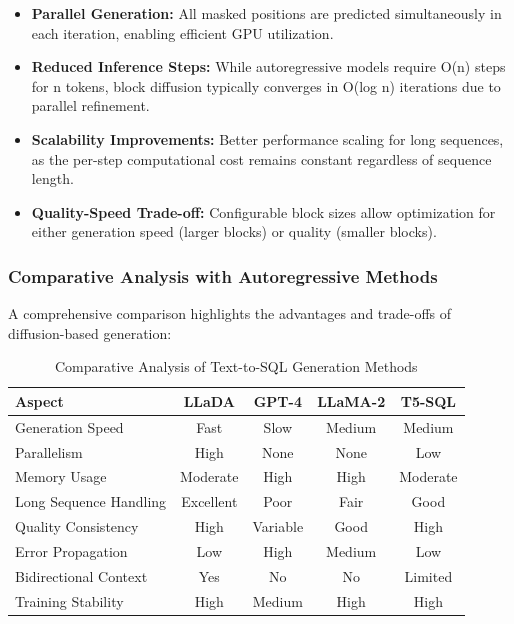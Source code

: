 \documentclass[a4paper,12pt]{article}
\begin{document}
\begin{itemize}
    \item \textbf{Parallel Generation:} All masked positions are predicted simultaneously in each iteration, enabling efficient GPU utilization.
    
    \item \textbf{Reduced Inference Steps:} While autoregressive models require O(n) steps for n tokens, block diffusion typically converges in O(log n) iterations due to parallel refinement.
    
    \item \textbf{Scalability Improvements:} Better performance scaling for long sequences, as the per-step computational cost remains constant regardless of sequence length.
    
    \item \textbf{Quality-Speed Trade-off:} Configurable block sizes allow optimization for either generation speed (larger blocks) or quality (smaller blocks).
\end{itemize}

\subsubsection*{Comparative Analysis with Autoregressive Methods}
A comprehensive comparison highlights the advantages and trade-offs of diffusion-based generation:

\begin{table}[H]
    \centering
    \begin{tabular}{lcccc}
        \toprule
        \textbf{Aspect} & \textbf{LLaDA} & \textbf{GPT-4} & \textbf{LLaMA-2} & \textbf{T5-SQL} \\
        \midrule
        Generation Speed & Fast & Slow & Medium & Medium \\
        Parallelism & High & None & None & Low \\
        Memory Usage & Moderate & High & High & Moderate \\
        Long Sequence Handling & Excellent & Poor & Fair & Good \\
        Quality Consistency & High & Variable & Good & High \\
        Error Propagation & Low & High & Medium & Low \\
        Bidirectional Context & Yes & No & No & Limited \\
        Training Stability & High & Medium & High & High \\
        \bottomrule
    \end{tabular}
    \caption{Comparative Analysis of Text-to-SQL Generation Methods}
\end{table}
\end{document}
